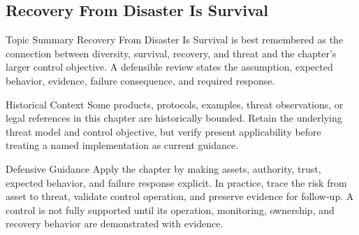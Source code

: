 \documentclass[11pt,letterpaper]{article}
\begin{document}
\subsection*{Recovery From Disaster Is Survival}
\begin{CornellNotesTable}
\end{CornellNotesTable}
\begin{CornellSummaryBox}{Topic Summary}
Recovery From Disaster Is Survival is best remembered as the connection between diversity, survival, recovery, and threat and the chapter's larger control objective. A defensible review states the assumption, expected behavior, evidence, failure consequence, and required response.
\end{CornellSummaryBox}
\begin{CornellWarningBox}{Historical Context}
Some products, protocols, examples, threat observations, or legal references in this chapter are historically bounded. Retain the underlying threat model and control objective, but verify present applicability before treating a named implementation as current guidance.
\end{CornellWarningBox}
\begin{CornellOverviewBox}{Defensive Guidance}
Apply the chapter by making assets, authority, trust, expected behavior, and failure response explicit. In practice, trace the risk from asset to threat, validate control operation, and preserve evidence for follow-up. A control is not fully supported until its operation, monitoring, ownership, and recovery behavior are demonstrated with evidence.
\end{CornellOverviewBox}
\end{document}
